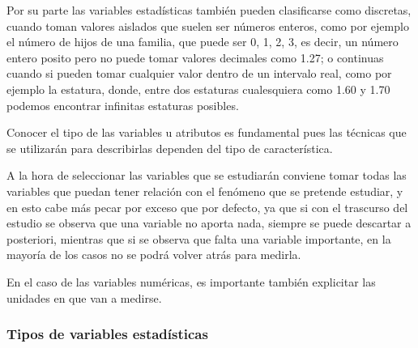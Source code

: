 \begin{frame}
{Por su parte las variables estadísticas también pueden clasificarse como discretas, cuando toman valores aislados que
suelen ser números enteros, como por ejemplo el número de hijos de una familia, que puede ser 0, 1, 2, 3, es decir, un
número entero posito pero no puede tomar valores decimales como 1.27; o continuas cuando si pueden tomar cualquier
valor dentro de un intervalo real, como por ejemplo la estatura, donde, entre dos estaturas cualesquiera como 1.60 y
1.70 podemos encontrar infinitas estaturas posibles.

Conocer el tipo de las variables u atributos es fundamental pues las técnicas que se utilizarán
para describirlas dependen del tipo de característica.

A la hora de seleccionar las variables que se estudiarán conviene tomar todas las variables que puedan tener relación
con el fenómeno que se pretende estudiar, y en esto cabe más pecar por exceso que por defecto, ya que si con el
trascurso del estudio se observa que una variable no aporta nada, siempre se puede descartar a posteriori, mientras que
si se observa que falta una variable importante, en la mayoría de los casos no se podrá volver atrás para
medirla.

En el caso de las variables numéricas, es importante también explicitar las unidades en que van a medirse.
}
\end{frame}

\begin{frame}
\frametitle{Tipos de variables estadísticas}
\begin{center}
\resizebox{\textwidth}{!}{}
\end{center}
\end{frame}



